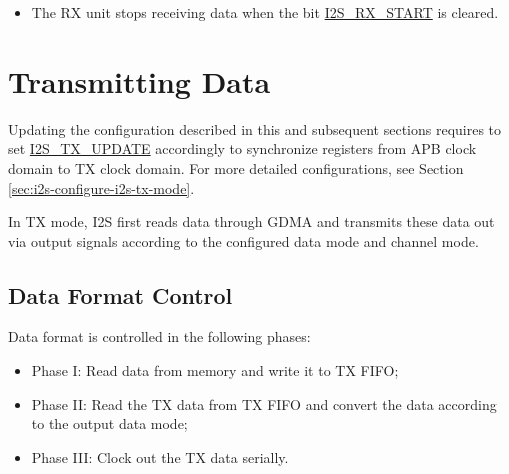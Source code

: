 \documentclass[main\_\_EN.tex]{subfiles}
\begin{document}
\begin{itemize}
\begin{itemize}
\begin{itemize}
            \item 1: The RX unit suspends data reception when the number of received bytes is greater than the value configured in \hyperref[regdesc:I2SRXEOFNUMREG]{I2S\_RX\_EOF\_NUM\_REG}. When \hyperref[fielddesc:I2SRXSTART]{I2S\_RX\_START} is not cleared, data reception can be restarted by setting \hyperref[fielddesc:I2SRXRESET]{I2S\_RX\_RESET} to 1.
            \item 2: The RX unit suspends data reception when \hyperref[fielddesc:I2SRXSTART]{I2S\_RX\_START} is cleared or GDMA RX FIFO is full. When \hyperref[fielddesc:I2SRXSTART]{I2S\_RX\_START} is not cleared and the GDMA RX FIFO is no longer full, data reception can be restarted by setting \hyperref[fielddesc:I2SRXRESET]{I2S\_RX\_RESET} to 1.
        \end{itemize}
        \item The RX unit stops receiving data when the bit \hyperref[fielddesc:I2SRXSTART]{I2S\_RX\_START} is cleared.
    \end{itemize}
\end{itemize}

\section{Transmitting Data}\label{sec:i2s-tx-data}

\vspace{1em}
\begin{tiplisting}
Updating the configuration described in this and subsequent sections requires to set \hyperref[fielddesc:I2STXUPDATE]{I2S\_TX\_UPDATE} accordingly to synchronize registers from APB clock domain to TX clock domain. For more detailed configurations, see Section \ref{sec:i2s-configure-i2s-tx-mode}.
\end{tiplisting}

\vspace{-1em}
In TX mode, I2S first reads data through GDMA and transmits these data out via output signals according to the configured data mode and channel mode.
\subsection{Data Format Control}\label{sec:i2s-data-control}
Data format is controlled in the following phases:
\begin{itemize}
    \item Phase I: Read data from memory and write it to TX FIFO;
    \item Phase II: Read the TX data from TX FIFO and convert the data according to the output data mode;
    \item Phase III: Clock out the TX data serially.
\end{itemize}
\end{document}

